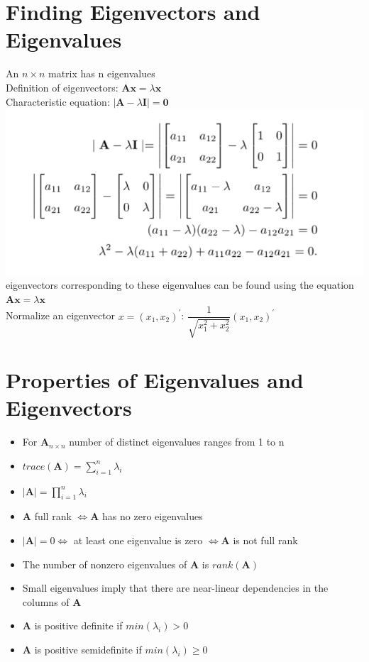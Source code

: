 \documentclass[openany]{book}
\newcommand{\lm}{\lambda}
\newcommand{\lra}{\Leftrightarrow}
\newcommand{\bma}{\bm{A}}
\numberwithin{equation}{section}
\begin{document}
\begin{flushleft}
\section{Finding Eigenvectors and Eigenvalues}
An $n\times n$ matrix has n eigenvalues\\
Definition of eigenvectors: $\bma\bm{x}=\lm\bm{x}$\\
Characteristic equation: $|\bma-\lm\bm{I}|=\bm{0}$\\
\includegraphics[scale=.5]{eigen.png}\\
eigenvectors corresponding to these eigenvalues can be found using the equation $\bm{Ax}=\lm\bm{x}$\\
Normalize an eigenvector $x=(x_1,x_2)^{'}$: $\dfrac{1}{\sqrt{x_1^2+x_2^2}}(x_1,x_2)^{'}$\\
\section{Properties of Eigenvalues and Eigenvectors}
\begin{itemize}
\item For $\bma_{n\times n}$ number of distinct eigenvalues ranges from 1 to n
\item $trace(\bma)=\sum_{i=1}^{n}\lm_i$
\item $|\bma|=\prod_{i=1}^{n}\lm_i$
\item $\bma$ full rank $\lra \bma$ has no zero eigenvalues
\item  $|\bma|=0\lra$ at least one eigenvalue is zero $\lra \bma$ is not full rank
\item The number of nonzero eigenvalues of $\bma$ is $rank(\bma)$
\item Small eigenvalues imply that there are near-linear dependencies in the columns of $\bma$
\item $\bma$ is positive definite if $min(\lm_i)>0$
\item $\bma$ is positive semidefinite if $min(\lm_i)\geq 0$
\end{itemize}

\end{flushleft}
\end{document}
